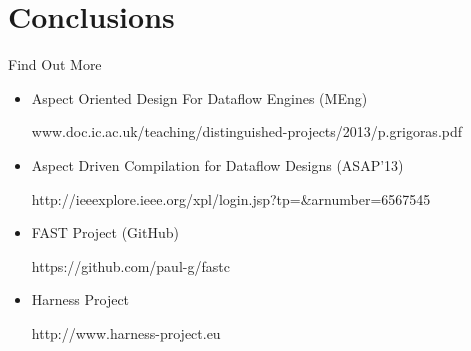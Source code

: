\section{Conclusions}
\begin{frame}{Find Out More}
\begin{itemize}
    \setlength{\itemsep}{15pt}
\item Aspect Oriented Design For Dataflow Engines (MEng)

  {\scriptsize \textcolor{UniBlue}{www.doc.ic.ac.uk/teaching/distinguished-projects/2013/p.grigoras.pdf}}

\item Aspect Driven Compilation for Dataflow Designs (ASAP'13)

  {\scriptsize \textcolor{UniBlue}{http://ieeexplore.ieee.org/xpl/login.jsp?tp=\&arnumber=6567545}}

\item FAST Project (GitHub)

  {\scriptsize \textcolor{UniBlue}{https://github.com/paul-g/fastc}}

\item Harness Project

  {\scriptsize \textcolor{UniBlue}{http://www.harness-project.eu}}
\end{itemize}

\end{frame}




